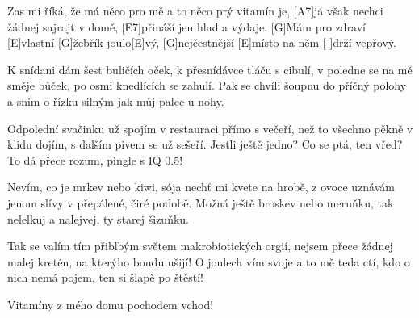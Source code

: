 
\sloka
[E7]Zas mi říká, že má něco pro mě a to něco prý vitamín je,
[A7]já však nechci žádnej sajrajt v domě, [E7]přináší jen hlad a výdaje.
[G]Mám pro zdraví [E]vlastní [G]žebřík joulo[E]vý,
[G]nejčestnější [E]místo na něm [-]drží vepřový.

\sloka
K snídani dám šest buličích oček, k přesnídávce tláču s cibulí,
v poledne se na mě směje bůček, po osmi knedlících se zahulí.
Pak se chvíli šoupnu do příčný polohy
a sním o řízku silným jak můj palec u nohy.

\sloka
Odpolední svačinku už spojím v restauraci přímo s večeří,
než to všechno pěkně v klidu dojím, s dalším pivem se už sešeří.
Jestli ještě jedno? Co se ptá, ten vřed?
To dá přece rozum, pingle s IQ 0.5!

\sloka
Nevím, co je mrkev nebo kiwi, sója nechť mi kvete na hrobě,
z ovoce uznávám jenom slívy v přepálené, čiré podobě.
Možná ještě broskev nebo meruňku,
tak nelelkuj a nalejvej, ty starej šizuňku.

\sloka
Tak se valím tím přiblbým světem makrobiotických orgií,
nejsem přece žádnej malej kretén, na kterýho boudu ušijí!
O joulech vím svoje a to mě teda ctí,
kdo o nich nemá pojem, ten si šlapě po štěstí!

\hvezda
Vitamíny z mého domu pochodem vchod!

